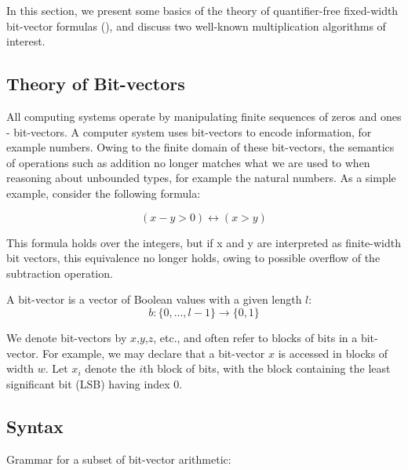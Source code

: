 In this section, we present some basics of the theory of
quantifier-free fixed-width bit-vector formulas (\qfbv), and discuss
two well-known multiplication algorithms of interest.

%

\subsection{Theory of Bit-vectors}

All computing systems operate by manipulating finite sequences of zeros and ones - bit-vectors. A computer system uses
bit-vectors to encode information, for example numbers. Owing to the finite
domain of these bit-vectors, the semantics of operations such as addition no
longer matches what we are used to when reasoning about unbounded types,
for example the natural numbers. As a simple example, consider the following formula:

\[( x-y > 0) \leftrightarrow (x > y)
\]

\noindent This formula holds over the integers, but if x and y are interpreted as finite-width bit vectors, this equivalence
no longer holds, owing to possible overflow of the subtraction operation.

A bit-vector is a vector of Boolean values with a given length $l$:
\[
b:\{0,. . .,l-1\} \rightarrow \{0,1\}
\]

%
\noindent We denote bit-vectors by $x$,$y$,$z$, etc., and often
%
refer to blocks of bits in a bit-vector.
%
For example, we may declare that a bit-vector $x$ is accessed in
blocks of width $w$.
%
Let $x_i$ denote the $i$th block of bits, with the block containing
the least significant bit (LSB) having index $0$.
%

\subsection{Syntax}


Grammar for a subset of bit-vector arithmetic:

